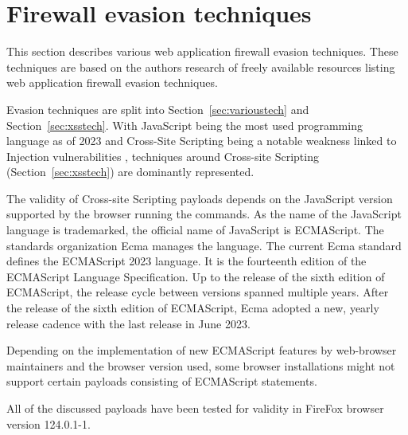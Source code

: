 \section{Firewall evasion techniques}
\label{sec:firewallevasiontechniques}

This section describes various web application firewall evasion techniques. These techniques are based on the authors research of freely available resources listing web application firewall evasion techniques.

Evasion techniques are split into Section~\ref{sec:varioustech} and Section~\ref{sec:xsstech}. With JavaScript being the most used programming language as of 2023 \cite{statista/mostusedlang} and Cross-Site Scripting being a notable weakness linked to Injection vulnerabilities \cite{OWASP/Injection21}, techniques around Cross-site Scripting (Section~\ref{sec:xsstech}) are dominantly represented.

The validity of Cross-site Scripting payloads depends on the JavaScript version supported by the browser running the commands. As the name of the JavaScript language is trademarked, the official name of JavaScript is ECMAScript. The standards organization Ecma manages the language. The current Ecma standard defines the ECMAScript 2023 language. It is the fourteenth edition of the ECMAScript Language Specification. Up to the release of the sixth edition of ECMAScript, the release cycle between versions spanned multiple years. After the release of the sixth edition of ECMAScript, Ecma adopted a new, yearly release cadence with the last release in June 2023. \cite{ecma/release,ecma/intro,explorejs/ecmascript}

Depending on the implementation of new ECMAScript features by web-browser maintainers and the browser version used, some browser installations might not support certain payloads consisting of ECMAScript statements. \cite{kangax/compattable}

All of the discussed payloads have been tested for validity in FireFox browser version 124.0.1-1.

